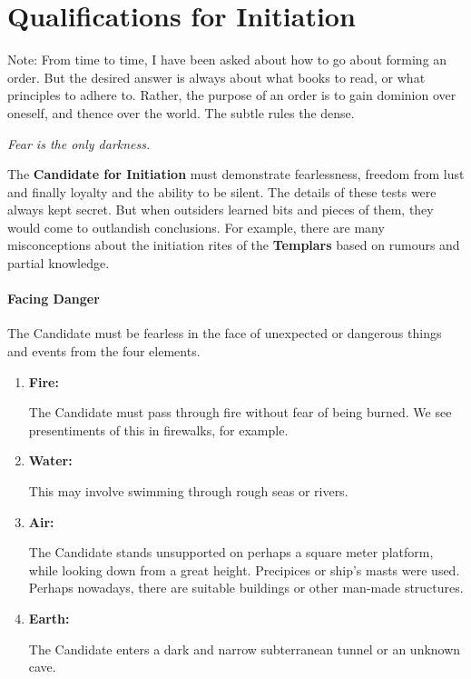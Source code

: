 \section{Qualifications for Initiation}

Note: From time to time, I have been asked about how to go about forming an order. But the desired answer is always about what books to read, or what principles to adhere to. Rather, the purpose of an order is to gain dominion over oneself, and thence over the world. The subtle rules the dense.

\emph{Fear is the only darkness.}

The \textbf{Candidate for Initiation} must demonstrate fearlessness, freedom from lust and finally loyalty and the ability to be silent. The details of these tests were always kept secret. But when outsiders learned bits and pieces of them, they would come to outlandish conclusions. For example, there are many misconceptions about the initiation rites of the \textbf{Templars} based on rumours and partial knowledge.

\paragraph{Facing Danger}


The Candidate must be fearless in the face of unexpected or dangerous things and events from the four elements.

\begin{enumerate}

\item \textbf{Fire:}

The Candidate must pass through fire without fear of being burned. We see presentiments of this in firewalks, for example.

\item \textbf{Water:}

This may involve swimming through rough seas or rivers.

\item \textbf{Air:}

The Candidate stands unsupported on perhaps a square meter platform, while looking down from a great height. Precipices or ship's masts were used. Perhaps nowadays, there are suitable buildings or other man-made structures.

\item \textbf{Earth:}

The Candidate enters a dark and narrow subterranean tunnel or an unknown cave.
\end{enumerate}


